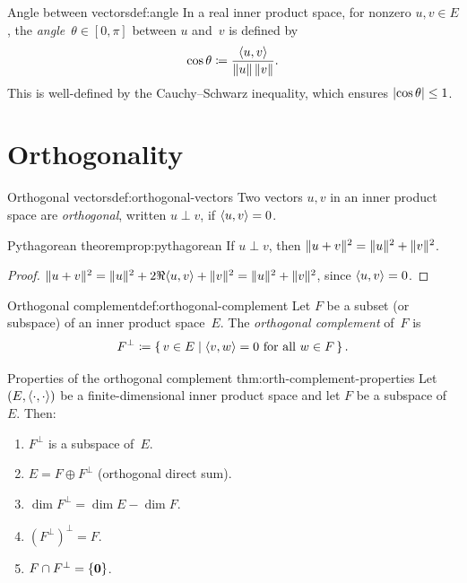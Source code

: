 \begin{definition}{Angle between vectors}{def:angle}
In a real inner product space, for nonzero $u,v\in E$, the
\emph{angle}~$\theta\in[0,\pi]$ between $u$ and~$v$ is defined by
\[
  \cos\theta \coloneqq \frac{\langle u,v\rangle}{\lVert u\rVert\,\lVert v\rVert}.
\]
This is well-defined by the Cauchy--Schwarz inequality, which ensures
$\lvert\cos\theta\rvert\leq 1$.
\end{definition}


\section{Orthogonality}\label{sec:orthogonality}

\begin{definition}{Orthogonal vectors}{def:orthogonal-vectors}
Two vectors $u,v$ in an inner product space are \emph{orthogonal},
written $u\perp v$, if $\langle u,v\rangle = 0$.
\end{definition}

\begin{proposition}{Pythagorean theorem}{prop:pythagorean}
If $u\perp v$, then $\lVert u+v\rVert^2 = \lVert u\rVert^2 + \lVert v\rVert^2$.
\end{proposition}

\begin{proof}
$\lVert u+v\rVert^2 = \lVert u\rVert^2 + 2\Re\langle u,v\rangle + \lVert v\rVert^2
= \lVert u\rVert^2 + \lVert v\rVert^2$, since $\langle u,v\rangle = 0$.
\end{proof}

\begin{definition}{Orthogonal complement}{def:orthogonal-complement}
Let $F$ be a subset (or subspace) of an inner product space~$E$.  The
\emph{orthogonal complement} of~$F$ is
\[
  F^{\perp} \coloneqq \left\{\,v\in E\;\middle|\;\langle v,w\rangle = 0
    \text{ for all } w\in F\,\right\}.
\]
\end{definition}

\begin{theorem}{Properties of the orthogonal complement}%
{thm:orth-complement-properties}
Let $(E,\langle\cdot,\cdot\rangle)$ be a finite-dimensional inner product
space and let $F$ be a subspace of~$E$.  Then:
\begin{enumerate}[label=(\roman*)]
  \item $F^{\perp}$ is a subspace of~$E$.
  \item $E = F \oplus F^{\perp}$ (orthogonal direct sum).
  \item $\dim F^{\perp} = \dim E - \dim F$.
  \item $(F^{\perp})^{\perp} = F$.
  \item $F\cap F^{\perp} = \left\{\mathbf{0}\right\}$.
\end{enumerate}
\end{theorem}

